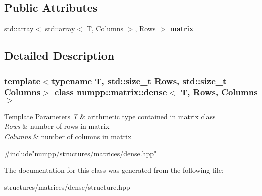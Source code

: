 \subsection*{Public Attributes}
\begin{DoxyCompactItemize}
\item 
\mbox{\label{classnumpp_1_1matrix_1_1dense_a0a1a99929da160a7c41fec853669bf39}} 
std\+::array$<$ std\+::array$<$ T, Columns $>$, Rows $>$ {\bfseries matrix\+\_\+}
\end{DoxyCompactItemize}


\subsection{Detailed Description}
\subsubsection*{template$<$typename T, std\+::size\+\_\+t Rows, std\+::size\+\_\+t Columns$>$\newline
class numpp\+::matrix\+::dense$<$ T, Rows, Columns $>$}


\begin{DoxyTemplParams}{Template Parameters}
{\em T} & arithmetic type contained in matrix class \\
\hline
{\em Rows} & number of rows in matrix \\
\hline
{\em Columns} & number of columns in matrix\\
\hline
\end{DoxyTemplParams}

\begin{DoxyCode}
\textcolor{preprocessor}{#include"numpp/structures/matrices/dense.hpp"}
\end{DoxyCode}
 

The documentation for this class was generated from the following file\+:\begin{DoxyCompactItemize}
\item 
structures/matrices/dense/structure.\+hpp\end{DoxyCompactItemize}
